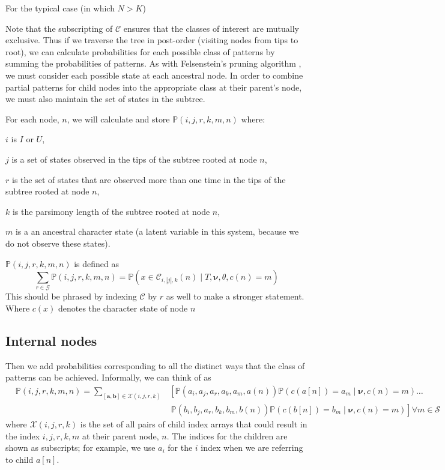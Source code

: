 \documentclass[11pt]{article}
\newcommand{\inform}{\ensuremath{I}\xspace}
\newcommand{\uninform}{\ensuremath{U}\xspace}
\newcommand{\numStates}{\ensuremath{K}\xspace}
\newcommand{\numLeavesTotal}{\ensuremath{N}\xspace}
\newcommand{\allStates}{\ensuremath{\mathcal S}\xspace}
\newcommand{\allStateSets}{\ensuremath{\mathcal G}\xspace}
\newcommand{\comboSet}{\ensuremath{\mathcal X}\xspace}
\newcommand{\edgeLengths}{\ensuremath{\bm \nu}\xspace}
\newcommand{\patProbSym}{\ensuremath{\mathbb P}\xspace}
\renewcommand{\Pr}{\patProbSym}
\newcommand{\patProb}[6]{\ensuremath{\patProbSym\left(#1,#2,#3,#4,#5,#6\right)}\xspace}
\newcommand{\patClassSym}{\ensuremath{\mathcal C}\xspace}
\newcommand{\patClass}[3]{\ensuremath{\patClassSym_{#1,#2,#3}}\xspace}
\newcommand{\stateOf}[1]{\ensuremath{c\left(#1\right)}\xspace}
\newcommand{\leftChild}[1]{\ensuremath{a\left[#1\right]}\xspace} %
\newcommand{\rightChild}[1]{\ensuremath{b\left[#1\right]}\xspace}%
\newcommand{\mthNote}[1]{{\color{red}#1}\\}
\begin{document}
For the typical case (in which $\numLeavesTotal >\numStates$)


Note that the subscripting of \patClassSym ensures that the classes of interest are mutually exclusive.
Thus if we traverse the tree in post-order (visiting nodes from tips to root), we can calculate probabilities for each possible class of patterns by summing the probabilities of patterns.
As with Felsenstein's pruning algorithm \citep{Felsenstein1981a}, we must consider each possible state at each ancestral node.
In order to combine partial patterns for child nodes into the appropriate class at their parent's node, we must also maintain the set of states in the subtree.

For each node, $n$, we will calculate and store \patProb{i}{j}{r}{k}{m}{n} where:
\begin{compactitem}
	\item $i$ is \inform  or \uninform,
	\item $j$ is a set of states observed in the tips of the subtree rooted at node $n$,
	\item $r$ is the set of states that are observed more than one time in the tips of the subtree rooted at node $n$,
	\item $k$ is the parsimony length of the subtree rooted at node $n$,
	\item $m$ is a an ancestral character state (a latent variable in this system, because we do not observe these states).
\end{compactitem}
\patProb{i}{j}{r}{k}{m}{n} is defined as
\begin{equation}
	\sum_{r\in\allStateSets}\patProb{i}{j}{r}{k}{m}{n} = \Pr\left(x\in\patClass{i}{|j|}{k}(n) \mid T, \edgeLengths, \theta, \stateOf{n}=m\right)
\end{equation}
\mthNote{This should be phrased by indexing $\patClassSym$ by $r$ as well to make a stronger statement.}
Where \stateOf{x} denotes the character state of node $n$



\subsection{Internal nodes}
Then we add probabilities corresponding to all the distinct ways that the class of patterns can be achieved.
Informally, we can think of  as
\begin{eqnarray*}
	&\patProb{i}{j}{r}{k}{m}{n} =  \sum_{[{\bm a}, {\bm b}]\in\comboSet(i, j, r, k)} & \left[\patProb{a_i}{a_j}{a_r}{a_k}{a_m}{a(n)}\Pr(\stateOf{\leftChild{n}}=a_m \mid \edgeLengths,\stateOf{n}=m)\ldots\right. \\
	 & & \,\left.\patProb{b_i}{b_j}{a_r}{b_k}{b_m}{b(n)}\Pr(\stateOf{\rightChild{n}}=b_m \mid \edgeLengths, \stateOf{n}=m)\right] \forall m \in\allStates
\end{eqnarray*}
where $\comboSet(i, j, r, k)$ is the set of all pairs of child index arrays that could result in the index $i,j,r,k,m$ at their parent node, $n$.
The indices for the children are shown as subscripts; for example, we use $a_i$ for the $i$ index when we are referring to child \leftChild{n}.
\end{document}
